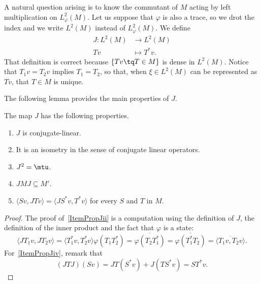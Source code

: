 A natural question arising is to know the commutant of $M$ acting by left multiplication on $ L_{\varphi}^2(M)$. Let us suppose that $\varphi$ is also a trace, so we drot the index and we write $ L^2(M)$ instead of $ L_{\varphi}^2(M)$. We define
\begin{equation}
	\begin{aligned}
		J\colon  L^2(M) & \to  L^2(M)   \\
		Tv              & \mapsto T^*v.
	\end{aligned}
\end{equation}
That definition is correct because $\{ Tv\tq T\in M \}$ is dense in $L^2(M)$. Notice that $T_1v=T_2v$ implies $T_1=T_2$, so that, when $\xi\in L^2(M)$ can be represented as $Tv$, that $T\in M$ is unique.

The following lemma provides the main properties of $J$.
\begin{lemma}			\label{LemPropJ}
	The map $J$ has the following properties.
	\begin{enumerate}
		\item $J$ is conjugate-linear.
		      \item\label{ItemPropJii} It is an isometry in the sense of conjugate linear operators.
		\item $J^2=\mtu$.
		      \item\label{ItemPropJiv} $JMJ\subseteq M'$.
		      \item\label{ItemPropJv}  $\langle Sv, JTv\rangle = \langle JS^*v, T^*v\rangle  $ for every $S$ and $T$ in $M$.
	\end{enumerate}
\end{lemma}

\begin{proof}
	The proof of~\ref{ItemPropJii} is a computation using the definition of $J$, the definition of the inner product and the fact that $\varphi$ is a state:
	\begin{equation}
		\langle JT_1v, JT_2v\rangle =\langle T_1^*v, T_2^*v\rangle\varphi(T_1T^*_2)=\overline{ \varphi(T_2T_1^*) }=\overline{ \varphi(T_1^*T_2) }=\overline{ \langle T_1v, T_2v\rangle  }.
	\end{equation}
	For~\ref{ItemPropJiv}, remark that
	\begin{equation}
		(JTJ)(Sv)=JT(S^*v)+J(TS^*v)=ST^*v.
	\end{equation}
\end{proof}

